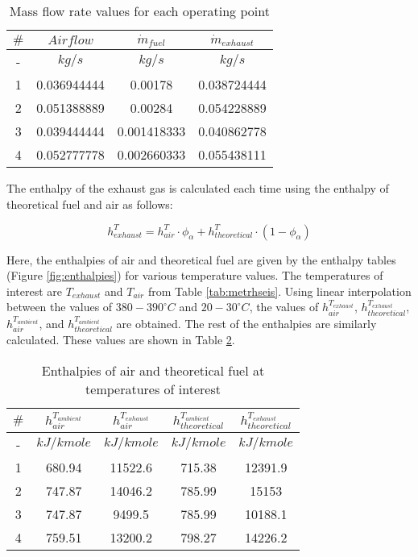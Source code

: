 \documentclass{report}
\begin{document}
\begin{table}[h]
    \centering
    \renewcommand{\arraystretch}{1.2} 
    \begin{tabular}{|c|c|c|c|}
    \hline
    \rowcolor{blue}
    $\#$ & $Airflow$ & $\dot{m}_{fuel}$ & $\dot{m}_{exhaust}$\\
    \hline
    \rowcolor{gray}
    - & $kg/s$ & $kg/s$ & $kg/s$\\
    \hline
    1 & 0.036944444 & 0.00178 & 0.038724444\\
    \hline
    2 & 0.051388889 & 0.00284 & 0.054228889\\
    \hline
    3 & 0.039444444 & 0.001418333 & 0.040862778\\
    \hline
    4 & 0.052777778 & 0.002660333 & 0.055438111\\
    \hline 
    \end{tabular}
    \caption{Mass flow rate values for each operating point}
    \label{tab:m.exh}
\end{table}

The enthalpy of the exhaust gas is calculated each time using the enthalpy of theoretical fuel and air as follows:

\begin{equation}
    \label{eq:h}
    h^T_{exhaust}=h^T_{air}\cdot \phi_{\alpha}+h^T_{theoretical}\cdot (1-\phi_{\alpha})
\end{equation}

Here, the enthalpies of air and theoretical fuel are given by the enthalpy tables (Figure \ref{fig:enthalpies}) for various temperature values. The temperatures of interest are $T_{exhaust}$ and $T_{air}$ from Table \ref{tab:metrhseis}. Using linear interpolation between the values of $380-390^\circ C$ and $20-30^\circ C$, the values of $h^{T_{exhaust}}_{air}$, $h^{T_{exhaust}}_{theoretical}$, $h^{T_{ambient}}_{air}$, and $h^{T_{ambient}}_{theoretical}$ are obtained. The rest of the enthalpies are similarly calculated. These values are shown in Table \ref{tab:hair/htheo}.

\begin{table}[!h]
    \centering
    \renewcommand{\arraystretch}{1.2} 
    \begin{tabular}{|c|c|c|c|c|}
    \hline
    \rowcolor{blue}
    $\#$ & $h^{T_{ambient}}_{air}$ & $h^{T_{exhaust}}_{air}$ & $h^{T_{ambient}}_{theoretical}$ & $h^{T_{exhaust}}_{theoretical}$\\
    \hline
    \rowcolor{gray}
    - & $kJ/kmole$ & $kJ/kmole$ & $kJ/kmole$ & $kJ/kmole$\\
    \hline
    1 & 680.94 & 11522.6 & 715.38 & 12391.9\\
    \hline
    2 & 747.87 & 14046.2 & 785.99 & 15153\\
    \hline
    3 & 747.87 & 9499.5 & 785.99 & 10188.1\\
    \hline
    4 & 759.51 & 13200.2 & 798.27 & 14226.2\\
    \hline 
    \end{tabular}
    \caption{Enthalpies of air and theoretical fuel at temperatures of interest}
    \label{tab:hair/htheo}
\end{table}
\end{document}
